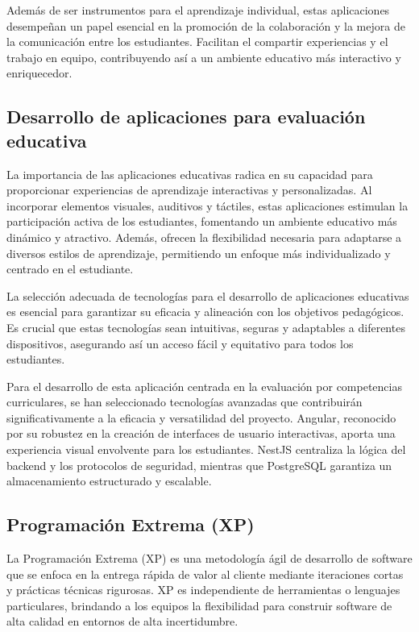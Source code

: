 Además de ser instrumentos para el aprendizaje individual, estas aplicaciones desempeñan un papel esencial en la promoción de la colaboración y la mejora de la comunicación entre los estudiantes. Facilitan el compartir experiencias y el trabajo en equipo, contribuyendo así a un ambiente educativo más interactivo y enriquecedor.

\subsection{Desarrollo de aplicaciones para evaluación educativa}

La importancia de las aplicaciones educativas radica en su capacidad para proporcionar experiencias de aprendizaje interactivas y personalizadas. Al incorporar elementos visuales, auditivos y táctiles, estas aplicaciones estimulan la participación activa de los estudiantes, fomentando un ambiente educativo más dinámico y atractivo. Además, ofrecen la flexibilidad necesaria para adaptarse a diversos estilos de aprendizaje, permitiendo un enfoque más individualizado y centrado en el estudiante.

La selección adecuada de tecnologías para el desarrollo de aplicaciones educativas es esencial para garantizar su eficacia y alineación con los objetivos pedagógicos. Es crucial que estas tecnologías sean intuitivas, seguras y adaptables a diferentes dispositivos, asegurando así un acceso fácil y equitativo para todos los estudiantes.

Para el desarrollo de esta aplicación centrada en la evaluación por competencias curriculares, se han seleccionado tecnologías avanzadas que contribuirán significativamente a la eficacia y versatilidad del proyecto. Angular, reconocido por su robustez en la creación de interfaces de usuario interactivas, aporta una experiencia visual envolvente para los estudiantes. NestJS centraliza la lógica del backend y los protocolos de seguridad, mientras que PostgreSQL garantiza un almacenamiento estructurado y escalable.

\subsection{Programación Extrema (XP)}

La Programación Extrema (XP) es una metodología ágil de desarrollo de software que se enfoca en la entrega rápida de valor al cliente mediante iteraciones cortas y prácticas técnicas rigurosas. XP es independiente de herramientas o lenguajes particulares, brindando a los equipos la flexibilidad para construir software de alta calidad en entornos de alta incertidumbre.


